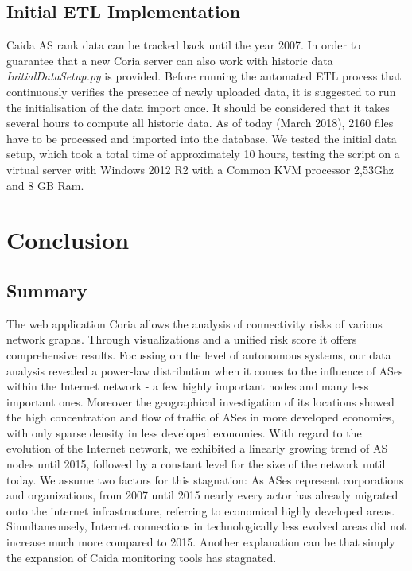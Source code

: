 \documentclass[conference, 11pt]{IEEEtran}
\begin{document}
\subsection{Initial ETL Implementation}
Caida AS rank data can be tracked back until the year 2007. In order to guarantee that a new Coria server can also work with historic data \textit{InitialDataSetup.py} is provided. Before running the automated ETL process that continuously verifies the presence of newly uploaded data, it is suggested to run the initialisation of the data import once. It should be considered that it takes several hours to compute all historic data. As of today (March 2018), 2160 files have to be processed and imported into the database. We tested the initial data setup, which took a total time of approximately 10 hours, testing the script on a virtual server with Windows 2012 R2 with a Common KVM processor 2,53Ghz and 8 GB Ram.  




\section{Conclusion}
\subsection{Summary}

The web application Coria allows the analysis of connectivity risks of various network graphs. Through visualizations and a unified risk score it offers comprehensive results. Focussing on the level of autonomous systems, our data analysis revealed a power-law distribution when it comes to the influence of ASes within the Internet network - a few highly important nodes and many less important ones. Moreover the geographical investigation of its locations showed the high concentration and flow of traffic of ASes in more developed economies, with only sparse density in less developed economies. With regard to the evolution of the Internet network, we exhibited a linearly growing trend of AS nodes until 2015, followed by a constant level for the size of the network until today. We assume two factors for this stagnation: As ASes represent corporations and organizations, from 2007 until 2015 nearly every actor has already migrated onto the internet infrastructure, referring to economical highly developed areas. Simultaneousely, Internet connections in technologically less evolved areas did not increase much more compared to 2015.  Another explanation can be that simply the expansion of Caida monitoring tools has stagnated.
\end{document}
